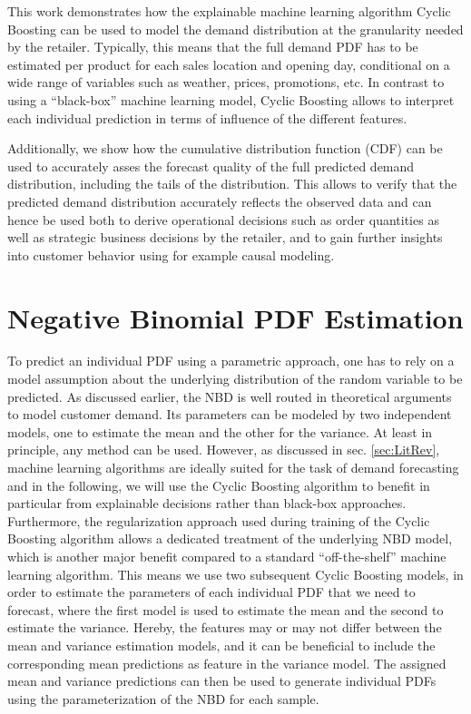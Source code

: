\documentclass[BCOR=1mm, DIV=calc,10pt,
twoside=true,
twocolumn,
headings=normal]{scrartcl}
\begin{document}
This work demonstrates how the explainable machine learning algorithm Cyclic Boosting \cite{Wick2019} can be used to model the demand distribution at the granularity needed by the retailer. Typically, this means that the full demand PDF has to be estimated per product for each sales location and opening day, conditional on a wide range of variables such as weather, prices, promotions, etc. In contrast to using a ``black-box'' machine learning model, Cyclic Boosting allows to interpret each individual prediction in terms of influence of the different features.

Additionally, we show how the cumulative distribution function (CDF) can be used to accurately asses the forecast quality of the full predicted demand distribution, including the tails of the distribution. This allows to verify that the predicted demand distribution accurately reflects the observed data and can hence be used both to derive operational decisions such as order quantities as well as strategic business decisions by the retailer, and to gain further insights into customer behavior using for example causal modeling.


\section{Negative Binomial PDF Estimation}
\label{sec:pdfEstimation}

To predict an individual PDF using a parametric approach, one has to rely on a model assumption about the underlying distribution of the random variable to be predicted. As discussed earlier, the NBD is well routed in theoretical arguments to model customer demand. Its parameters can be modeled by two independent models, one to estimate the mean and the other for the variance. At least in principle, any method can be used. However, as discussed in sec. \ref{sec:LitRev}, machine learning algorithms are ideally suited for the task of demand forecasting and in the following, we will use the Cyclic Boosting algorithm to benefit in particular from explainable decisions rather than black-box approaches. Furthermore, the regularization approach used during training of the Cyclic Boosting algorithm allows a dedicated treatment of the underlying NBD model, which is another major benefit compared to a standard ``off-the-shelf'' machine learning algorithm. This means we use two subsequent Cyclic Boosting models, in order to estimate the parameters of each individual PDF that we need to forecast, where the first model is used to estimate the mean and the second to estimate the variance. Hereby, the features may or may not differ between the mean and variance estimation models, and it can be beneficial to include the corresponding mean predictions as feature in the variance model. The assigned mean and variance predictions can then be used to generate individual PDFs using the parameterization of the NBD for each sample.
\end{document}
